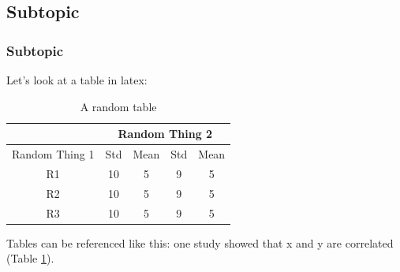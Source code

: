 \subsection{Subtopic}
\lipsum[1]
\subsubsection{Subtopic}

\noindent Let's look at a table in latex:

\begin{table}[H]
    \centering
    \begin{tabular}{c|c c|c c}
         &\multicolumn{4}{c}{Random Thing 2} \\\hline
         Random Thing 1 & Std & Mean & Std & Mean  \\\hline
         R1&10&5&9&5\\
         R2&10&5&9&5\\
         R3&10&5&9&5\\
    \end{tabular}
    \caption{\label{tab:1}A random table}
\end{table}

\noindent Tables can be referenced like this: one study showed that x and y are correlated (Table \ref{tab:1}).